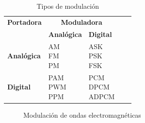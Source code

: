 \begin{table}[!h]\centering
\centering
\caption{Tipos de modulaci\'on}
\label{tab:06.tipos.modulacion}
  
{\footnotesize

\begin{tabular}{lllll} \hline
  {\bf Portadora} & \multicolumn{2}{c}{\bf Moduladora} \\ \cline{2-3}
& {\bf Anal\'ogica} & {\bf Digital}  \\ \hline \rowcolor{yellow!30}
{\bf Anal\'ogica} & \parbox{0.4\textwidth}{\ac{AM} \\ \ac{FM} \\ \ac{PM}} & \parbox{0.4\textwidth}{\ac{ASK} \\ \ac{PSK} \\
\ac{FSK}}  \\ 
{\bf Digital}  & \parbox{0.4\textwidth}{\ac{PAM} \\ \ac{PWM} \\ \ac{PPM} } & \parbox{0.4\textwidth}{\ac{PCM} \\ \ac{DPCM} \\ \ac{ADPCM}} \\ \hline
\end{tabular}

}

\end{table}


  \begin{figure}[!h]
    \centering
{} \hspace{20pt}
\caption{Modulaci\'on de ondas electromagn\'eticas}
  \end{figure}


